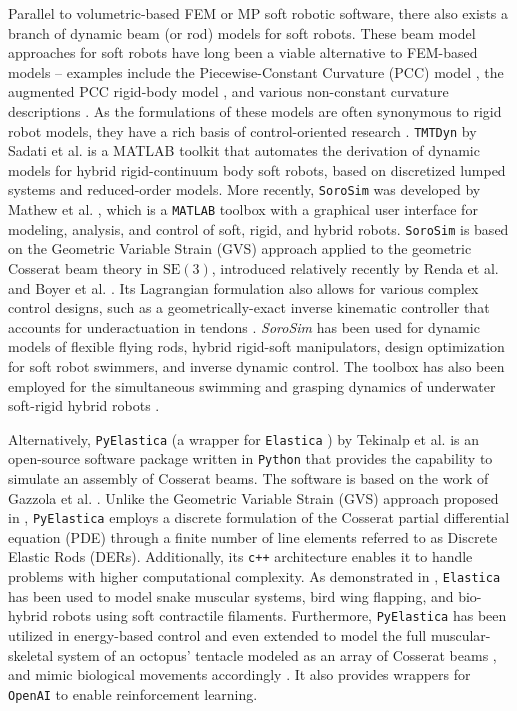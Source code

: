 Parallel to volumetric-based FEM or MP soft robotic software, there also exists a branch of dynamic beam (or rod) models for soft robots. These beam model approaches for soft robots have long been a viable alternative to FEM-based models -- examples include the Piecewise-Constant Curvature (PCC) model \cite{Falkenhahn2015,Stolzle2021,Caasenbrood2022}, the augmented PCC rigid-body model \cite{DellaSantina2020,Trumic2020,Kazemipour2022}, and various non-constant curvature descriptions \cite{DellaSantina2020,Wang2022Mar,Boyer2021,Renda2020}. As the formulations of these models are often synonymous to rigid robot models, they have a rich basis of control-oriented research \cite{Borja2022Apr,Pustina2022,Caasenbrood2022,Fischer2022}. \texttt{TMTDyn} by Sadati et al. \cite{Sadati2020} is a MATLAB toolkit that automates the derivation of dynamic models for hybrid rigid-continuum body soft robots, based on discretized lumped systems and reduced-order models. More recently, \texttt{SoroSim} was developed by Mathew et al. \cite{Mathew2022}, which is a \texttt{MATLAB} toolbox with a graphical user interface for modeling, analysis, and control of soft, rigid, and hybrid robots. \texttt{SoroSim} is based on the Geometric Variable Strain (GVS) approach applied to the geometric Cosserat beam theory in $\textrm{SE}(3)$, introduced relatively recently by Renda et al. \cite{Renda2020} and Boyer et al. \cite{Boyer2021}. Its Lagrangian formulation also allows for various complex control designs, such as a geometrically-exact inverse kinematic controller that accounts for underactuation in tendons \cite{Mathew2022}. \textit{SoroSim} has been used for dynamic models of flexible flying rods, hybrid rigid-soft manipulators, design optimization for soft robot swimmers, and inverse dynamic control. The toolbox has also been employed for the simultaneous swimming and grasping dynamics of underwater soft-rigid hybrid robots \cite{Mathew2022Oct}.

Alternatively, \texttt{PyElastica} (a wrapper for \texttt{Elastica} \cite{Naughton2021}) by Tekinalp et al. \cite{Tekinalp2022} is an open-source software package written in \texttt{Python} that provides the capability to simulate an assembly of Cosserat beams. The software is based on the work of Gazzola et al. \cite{Gazzola2018}. Unlike the Geometric Variable Strain (GVS) approach proposed in \cite{Renda2020,Boyer2021,Mathew2022}, \texttt{PyElastica} employs a discrete formulation of the Cosserat partial differential equation (PDE) through a finite number of line elements referred to as Discrete Elastic Rods (DERs). Additionally, its \texttt{c++} architecture enables it to handle problems with higher computational complexity. As demonstrated in \cite{Zhang2019}, \texttt{Elastica} has been used to model snake muscular systems, bird wing flapping, and bio-hybrid robots using soft contractile filaments. Furthermore, \texttt{PyElastica} has been utilized in energy-based control and even extended to model the full muscular-skeletal system of an octopus' tentacle modeled as an array of Cosserat beams \cite{Chang2022}, and mimic biological movements accordingly \cite{Wang2022Dec}. It also provides wrappers for \texttt{OpenAI} to enable reinforcement learning.

